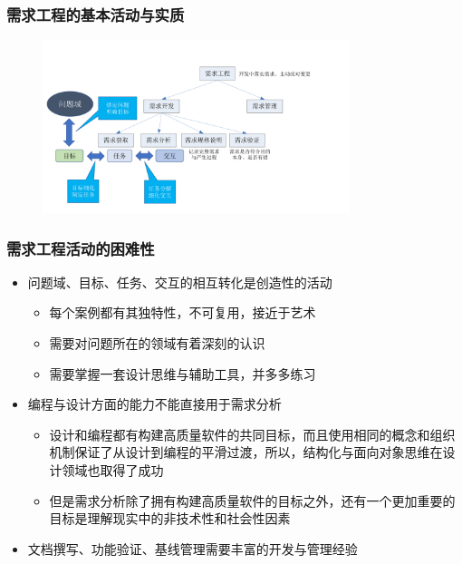 \subsubsection{需求工程的基本活动与实质}
\begin{figure}[H]
	\centering
	\includegraphics[width=0.8\textwidth]{img/需求工程的基本活动与实质.pdf}
\end{figure}

\subsubsection{需求工程活动的困难性}
\begin{itemize}
    \item 问题域、目标、任务、交互的相互转化是创造性的活动
    \begin{itemize}
        \item 每个案例都有其独特性，不可复用，接近于艺术
        \item 需要对问题所在的领域有着深刻的认识
        \item 需要掌握一套设计思维与辅助工具，并多多练习
    \end{itemize}
    \item 编程与设计方面的能力不能直接用于需求分析 
    \begin{itemize}
        \item 设计和编程都有构建高质量软件的共同目标，而且使用相同的概念和组织机制保证了从设计到编程的平滑过渡，所以，结构化与面向对象思维在设计领域也取得了成功
        \item 但是需求分析除了拥有构建高质量软件的目标之外，还有一个更加重要的目标是理解现实中的非技术性和社会性因素
    \end{itemize}
    \item 文档撰写、功能验证、基线管理需要丰富的开发与管理经验
\end{itemize}


